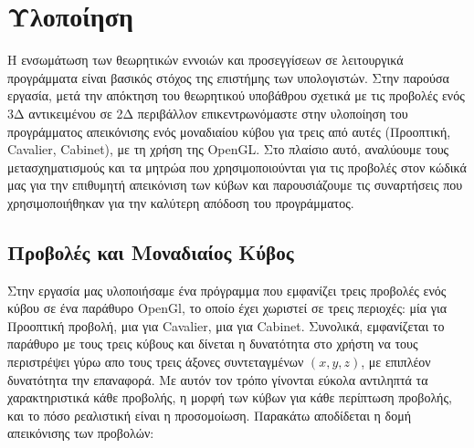 \chapter{Υλοποίηση}
Η ενσωμάτωση των θεωρητικών εννοιών και προσεγγίσεων σε λειτουργικά προγράμματα είναι βασικός στόχος της επιστήμης των υπολογιστών. Στην παρούσα εργασία, μετά την απόκτηση του θεωρητικού υποβάθρου σχετικά με τις προβολές ενός 3Δ αντικειμένου σε 2Δ περιβάλλον επικεντρωνόμαστε στην υλοποίηση του προγράμματος απεικόνισης ενός μοναδιαίου κύβου για τρεις από αυτές (Προοπτική, Cavalier, Cabinet), με τη χρήση της \textlatin{OpenGL}. Στο πλαίσιο αυτό,  αναλύουμε τους μετασχηματισμούς και τα μητρώα που χρησιμοποιούνται για τις προβολές στον κώδικά μας για την επιθυμητή απεικόνιση των κύβων και παρουσιάζουμε τις συναρτήσεις που χρησιμοποιήθηκαν για την καλύτερη απόδοση του προγράμματος. 

\section{Προβολές και Μοναδιαίος Κύβος}

Στην εργασία μας υλοποιήσαμε ένα πρόγραμμα που εμφανίζει τρεις προβολές ενός κύβου σε ένα παράθυρο OpenGl, το οποίο έχει χωριστεί σε τρεις περιοχές: μία για Προοπτική προβολή, μια για Cavalier, μια για Cabinet. Συνολικά, εμφανίζεται το παράθυρο με τους τρεις κύβους και δίνεται η δυνατότητα στο χρήστη να τους περιστρέψει γύρω απο τους τρεις άξονες συντεταγμένων $(x,y,z)$, με επιπλέον δυνατότητα την επαναφορά. Με αυτόν τον τρόπο γίνονται εύκολα αντιληπτά τα χαρακτηριστικά κάθε προβολής, η μορφή των κύβων για κάθε περίπτωση προβολής, και το πόσο ρεαλιστική είναι η προσομοίωση. Παρακάτω αποδίδεται η δομή απεικόνισης των προβολών:

